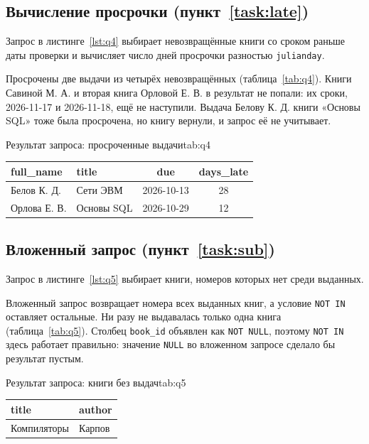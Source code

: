 \subsection{Вычисление просрочки (пункт~\ref{task:late})}
Запрос в листинге~\ref{lst:q4} выбирает невозвращённые книги со сроком раньше даты проверки
и вычисляет число дней просрочки разностью \texttt{julianday}.


Просрочены две выдачи из четырёх невозвращённых (таблица~\ref{tab:q4}). Книги Савиной М. А.
и вторая книга Орловой Е. В. в результат не попали: их сроки, 2026-11-17 и 2026-11-18, ещё не
наступили. Выдача Белову К. Д. книги «Основы SQL» тоже была просрочена, но книгу вернули,
и запрос её не учитывает.

\begin{bbttable}{Результат запроса: просроченные выдачи}{tab:q4}
  \begin{tabular}{|l|l|c|c|}
    \hline
    full\_name & title & due & days\_late \\ \hline
    Белов К. Д. & Сети ЭВМ & 2026-10-13 & 28 \\ \hline
    Орлова Е. В. & Основы SQL & 2026-10-29 & 12 \\ \hline
  \end{tabular}
\end{bbttable}

\subsection{Вложенный запрос (пункт~\ref{task:sub})}
Запрос в листинге~\ref{lst:q5} выбирает книги, номеров которых нет среди выданных.


Вложенный запрос возвращает номера всех выданных книг, а условие \texttt{NOT IN} оставляет
остальные. Ни разу не выдавалась только одна книга (таблица~\ref{tab:q5}). Столбец
\texttt{book\_id} объявлен как \texttt{NOT NULL}, поэтому \texttt{NOT IN} здесь работает
правильно: значение \texttt{NULL} во вложенном запросе сделало бы результат пустым.

\begin{bbttable}{Результат запроса: книги без выдач}{tab:q5}
  \begin{tabular}{|l|l|}
    \hline
    title & author \\ \hline
    Компиляторы & Карпов \\ \hline
  \end{tabular}
\end{bbttable}
